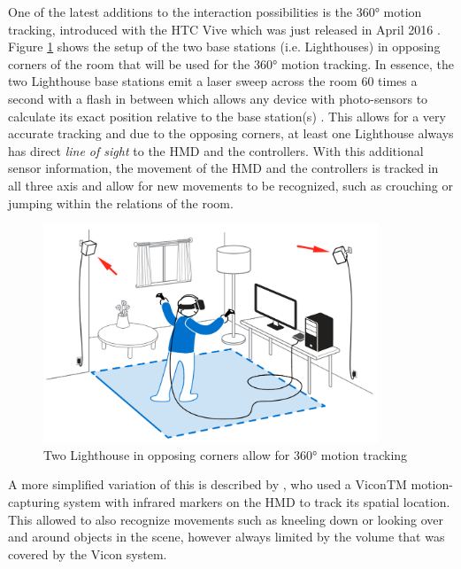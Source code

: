 One of the latest additions to the interaction possibilities is the 360° motion tracking, introduced with the HTC Vive which was just released in April 2016 \citep{Htcvive2016}. Figure \ref{fig:lighthouses} shows the setup of the two base stations (i.e. Lighthouses) in opposing corners of the room that will be used for the 360° motion tracking. In essence, the two Lighthouse base stations emit a laser sweep across the room 60 times a second with a flash in between which allows any device with photo-sensors to calculate its exact position relative to the base station(s) \citep{Gizmodo2015}. This allows for a very accurate tracking and due to the opposing corners, at least one Lighthouse always has direct \textit{line of sight} to the HMD and the controllers. \newline
With this additional sensor information, the movement of the HMD and the controllers is tracked in all three axis and allow for new movements to be recognized, such as crouching or jumping within the relations of the room.
\begin{figure}[h]
	\begin{center}
		\includegraphics[width=10cm]{03_Figures/05_LitReview/HTCCorp2016_LighthouseRoomScale.png}
		\caption[Two Lighthouse in opposing corners allow for 360° motion tracking]{Two Lighthouse in opposing corners allow for 360° motion tracking \citep{HTCCorp2016}}
		\label{fig:lighthouses}
	\end{center}
\end{figure} \newline
A more simplified variation of this is described by \cite{Donalek2014}, who used a ViconTM motion-capturing system with infrared markers on the HMD to track its spatial location. This allowed \cite{Donalek2014} to also recognize movements such as kneeling down or looking over and around objects in the scene, however always limited by the volume that was covered by the Vicon system.


